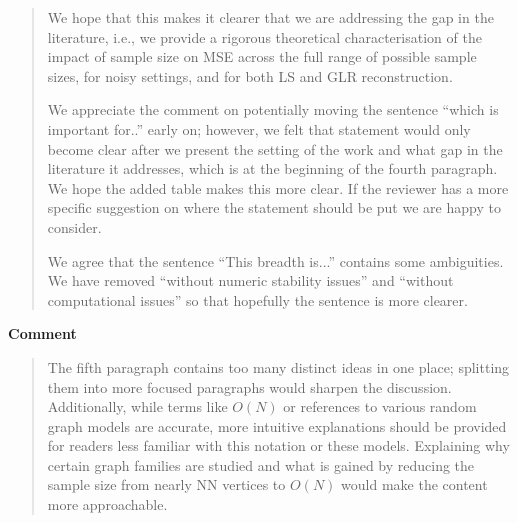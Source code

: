\documentclass[11pt,onecolumn,journal]{IEEEtran}
\theoremstyle{definition}
\begin{document}
\begin{quote}
We hope that this makes it clearer that we are addressing the gap in the literature, i.e., we provide a rigorous theoretical characterisation of the impact of sample size on MSE across the full range of possible sample sizes, for noisy settings, and for both LS and GLR reconstruction.

We appreciate the comment on potentially moving the sentence ``which is important for..'' early on; however, we felt that statement would only become clear after we present the setting of the work and what gap in the literature it addresses, which is at the beginning of the fourth paragraph. We hope the added table makes this more clear. If the reviewer has a more specific suggestion on where the statement should be put we are happy to consider.

We agree that the sentence ``This breadth is...'' contains some ambiguities. We have removed ``without numeric stability issues'' and ``without computational issues'' so that hopefully the sentence is more clearer. 



    
\end{quote}
\textbf{Comment}
\begin{quote}
The fifth paragraph contains too many distinct ideas in one place; splitting them into more focused paragraphs would sharpen the discussion. Additionally, while terms like $O(N)$ or references to various random graph models are accurate, more intuitive explanations should be provided for readers less familiar with this notation or these models. Explaining why certain graph families are studied and what is gained by reducing the sample size from nearly NN vertices to $O(N)$ would make the content more approachable.
\end{quote}
\end{document}
